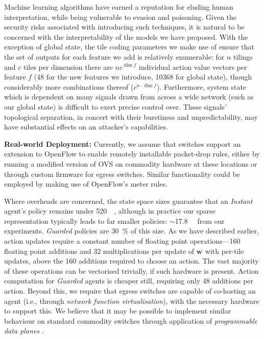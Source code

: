 \documentclass[10pt, times, comsoc]{IEEEtran}
\newcommand{\wvec}[1]{\ensuremath{\bm{w}_{#1}}}
\newcommand{\fakepara}[1]{\noindent\textbf{#1:}}
\begin{document}
Machine learning algorithms have earned a reputation for eluding human interpretation, while being vulnerable to evasion and poisoning.
Given the security risks associated with introducing such techniques, it is natural to be concerned with the interpretability of the models we have proposed.
With the exception of global state, the tile coding parameters we make use of ensure that the set of outputs for each feature we add is relatively enumerable: for $n$ tilings and $c$ tiles per dimension there are $nc^{\dim{f}}$ individual action value vectors per feature $f$ (\num{48} for the new features we introduce, \num{10368} for global state), though considerably more combinations thereof ($c^{n \cdot \dim{f}}$).
Furthermore, system state which is dependent on many signals drawn from across a wide network (such as our global state) is difficult to exert precise control over.
These signals' topological separation, in concert with their burstiness and unpredictability, may have substantial effects on an attacker's capabilities.

\fakepara{Real-world Deployment}
Currently, we assume that switches support an extension to OpenFlow to enable remotely installable packet-drop rules, either by running a modified version of OVS on commodity hardware at these locations or through custom firmware for egress switches.
Similar functionality could be employed by making use of OpenFlow's meter rules.

Where overheads are concerned, the state space sizes guarantee that an \emph{Instant} agent's policy remains under \SI{520}{\kibi\byte}, although in practice our sparse representation typically leads to far smaller policies: $\sim$\SI{17.8}{\kibi\byte} from our experiments.
\emph{Guarded} policies are \SI{30}{\percent} of this size.
As we have described earlier, action updates require a constant number of floating point operations---\num{160} floating point additions and \num{32} multiplications per update of $\wvec{}$ with per-tile updates, above the \num{160} additions required to choose an action.
The vast majority of these operations can be vectorised trivially, if such hardware is present.
Action computation for \emph{Guarded} agents is cheaper still, requiring only \num{48} additions per action.
Beyond this, we require that egress switches are capable of co-hosting an agent (i.e., through \emph{network function virtualisation}), with the necessary hardware to support this.
We believe that it may be possible to implement similar behaviour on standard commodity switches through application of \emph{programmable data planes} \cite{DBLP:conf/ancs/JouetP17}.
\end{document}
